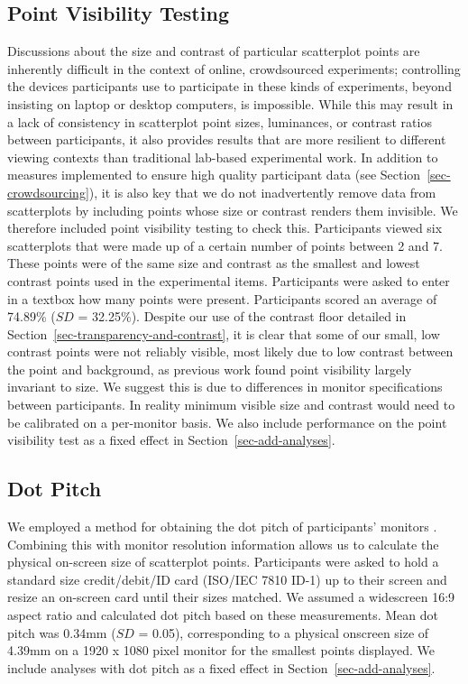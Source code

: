 \documentclass[manuscript, review, anonymous, screen]{acmart}
\begin{document}
\hypertarget{sec-VT}{%
\subsection{Point Visibility Testing}\label{sec-VT}}

Discussions about the size and contrast of particular scatterplot points
are inherently difficult in the context of online, crowdsourced
experiments; controlling the devices participants use to participate in
these kinds of experiments, beyond insisting on laptop or desktop
computers, is impossible. While this may result in a lack of consistency
in scatterplot point sizes, luminances, or contrast ratios between
participants, it also provides results that are more resilient to
different viewing contexts than traditional lab-based experimental work.
In addition to measures implemented to ensure high quality participant
data (see Section~\ref{sec-crowdsourcing}), it is also key that we do
not inadvertently remove data from scatterplots by including points
whose size or contrast renders them invisible. We therefore included
point visibility testing to check this. Participants viewed six
scatterplots that were made up of a certain number of points between 2
and 7. These points were of the same size and contrast as the smallest
and lowest contrast points used in the experimental items. Participants
were asked to enter in a textbox how many points were present.
Participants scored an average of 74.89\% (\(SD\) = 32.25\%). Despite
our use of the contrast floor detailed in
Section~\ref{sec-transparency-and-contrast}, it is clear that some of
our small, low contrast points were not reliably visible, most likely
due to low contrast between the point and background, as previous work
\citep{strain_2023b} found point visibility largely invariant to size.
We suggest this is due to differences in monitor specifications between
participants. In reality minimum visible size and contrast would need to
be calibrated on a per-monitor basis. We also include performance on the
point visibility test as a fixed effect in
Section~\ref{sec-add-analyses}.

\hypertarget{sec-dot-pitch}{%
\subsection{Dot Pitch}\label{sec-dot-pitch}}

We employed a method for obtaining the dot pitch of participants'
monitors \citep{screenscale}. Combining this with monitor resolution
information allows us to calculate the physical on-screen size of
scatterplot points. Participants were asked to hold a standard size
credit/debit/ID card (ISO/IEC 7810 ID-1) up to their screen and resize
an on-screen card until their sizes matched. We assumed a widescreen
16:9 aspect ratio and calculated dot pitch based on these measurements.
Mean dot pitch was 0.34mm (\(SD\) = 0.05), corresponding to a physical
onscreen size of 4.39mm on a 1920 x 1080 pixel monitor for the smallest
points displayed. We include analyses with dot pitch as a fixed effect
in Section~\ref{sec-add-analyses}.
\end{document}
